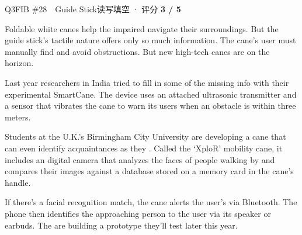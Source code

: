 \begin{qblock}{Q3\quad FIB \#28\ \ Guide Stick}{读写填空 · 评分 \textcolor{cAccent}{\bfseries 3 / 5}}
\begin{promptbox}
Foldable white canes help the  impaired navigate their surroundings. But the guide stick's tactile nature offers only so much information. The cane's user must manually find and avoid obstructions. But new high-tech canes are on the horizon.

Last year researchers in India tried to fill in some of the missing info with their experimental SmartCane. The device uses an attached ultrasonic transmitter and a sensor that vibrates the cane to warn its users when an obstacle is within three meters.

Students at the U.K.'s Birmingham City University are developing a cane that can even identify acquaintances as they . Called the `XploR' mobility cane, it includes an  digital camera that analyzes the faces of people walking by and compares their images against a database stored on a memory card in the cane's handle.

If there's a facial recognition match, the cane alerts the user's  via Bluetooth. The phone then identifies the approaching person to the user via its speaker or earbuds. The  are building a prototype they'll test later this year.


\end{promptbox}
\end{qblock}
